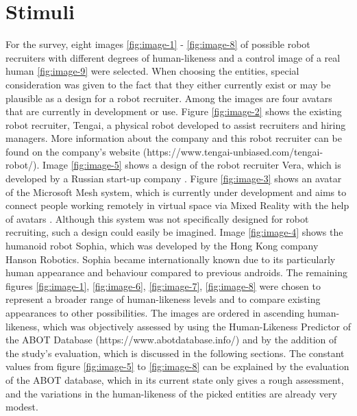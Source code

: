 \section{Stimuli}
For the survey, eight images \ref{fig:image-1} - \ref{fig:image-8} of possible robot recruiters with different degrees of human-likeness and a control image of a real human \ref{fig:image-9} were selected. When choosing the entities, special consideration was given to the fact that they either currently exist or may be plausible as a design for a robot recruiter. Among the images are four avatars that are currently in development or use. Figure \ref{fig:image-2} shows the existing robot recruiter, Tengai, a physical robot developed to assist recruiters and hiring managers. More information about the company and this robot recruiter can be found on the company's website (https://www.tengai-unbiased.com/tengai-robot/). Image \ref{fig:image-5} shows a design of the robot recruiter Vera, which is developed by a Russian start-up company \cite{vera}. Figure \ref{fig:image-3} shows an avatar of the Microsoft Mesh system, which is currently under development and aims to connect people working remotely in virtual space via Mixed Reality with the help of avatars \cite{microsoft_mesh}. Although this system was not specifically designed for robot recruiting, such a design could easily be imagined. Image \ref{fig:image-4} shows the humanoid robot Sophia, which was developed by the Hong Kong company Hanson Robotics. Sophia became internationally known due to its particularly human appearance and behaviour compared to previous androids. The remaining figures \ref{fig:image-1}, \ref{fig:image-6}, \ref{fig:image-7}, \ref{fig:image-8} were chosen to represent a broader range of human-likeness levels and to compare existing appearances to other possibilities. The images are ordered in ascending human-likeness, which was objectively assessed by using the Human-Likeness Predictor of the ABOT Database (https://www.abotdatabase.info/) and by the addition of the study's evaluation, which is discussed in the following sections. The constant values from figure \ref{fig:image-5} to \ref{fig:image-8} can be explained by the evaluation of the ABOT database, which in its current state only gives a rough assessment, and the variations in the human-likeness of the picked entities are already very modest.
\begin{table}[b!]
\centering
{}
\caption{Rated human-likeness of the figures.}
\label{tab:rated-human-likeness}
\end{table}
\newpage

